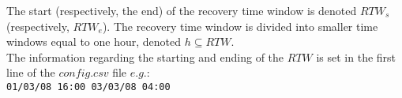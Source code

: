 The start (respectively, the end) of the recovery
time window is denoted $ RTW_s $ (respectively, $ RTW_e $). The recovery time window is divided
into smaller time windows equal to one hour, denoted $ h \subseteq RTW $.\\ 

The information regarding the starting and ending of the $RTW$ is set in the first line of the $config.csv$ file $e.g.$:\\
\newline
{\texttt{\footnotesize 01/03/08 16:00 03/03/08 04:00 }}



